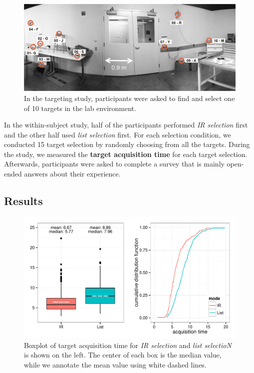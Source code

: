 \begin{figure}[t]
\centering
\includegraphics[width=1.0\columnwidth]{figures/study-layout1.png}
\caption{In the targeting study, participants were asked to find and select one of 10 targets in the lab environment.}
\label{fig:targeting-study-layout}
\end{figure}

In the within-subject study, half of the participants performed {\em IR selection} first and the other half used {\em list selection} first. For each selection condition, we conducted 15 target selection by randomly choosing from all the targets. During the study, we measured the {\bf target acquisition time} for each target selection. Afterwards, participants were asked to complete a survey that is mainly open-ended answers about their experience.


\subsection{Results}

\begin{figure}[t]
\centering
\includegraphics[width=1.0\columnwidth]{figures/result_study1a.pdf}
\caption{Boxplot of target acquisition time for {\em IR selection} and {\em list selectioN} is shown on the left. The center of each box is the median value, while we annotate the mean value using white dashed lines.}
\label{fig:ir_vs_list}
\end{figure}

